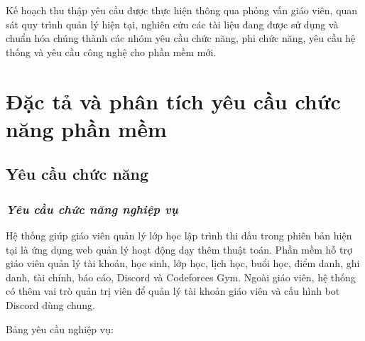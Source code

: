 \documentclass[12pt,a4paper]{article}
\begin{document}
Kế hoạch thu thập yêu cầu được thực hiện thông qua phỏng vấn giáo viên, quan sát
quy trình quản lý hiện tại, nghiên cứu các tài liệu đang được sử dụng và chuẩn
hóa chúng thành các nhóm yêu cầu chức năng, phi chức năng, yêu cầu hệ thống và
yêu cầu công nghệ cho phần mềm mới.

\section{Đặc tả và phân tích yêu cầu chức năng phần mềm}

\subsection{Yêu cầu chức năng}

\subsubsection{\textit{Yêu cầu chức năng nghiệp vụ}}

Hệ thống giúp giáo viên quản lý lớp học lập trình thi đấu trong phiên bản hiện tại là ứng dụng web
quản lý hoạt động dạy thêm thuật toán. Phần mềm hỗ trợ giáo viên quản lý tài
khoản, học sinh, lớp học, lịch học, buổi học, điểm danh, ghi danh, tài chính,
báo cáo, Discord và Codeforces Gym. Ngoài giáo viên, hệ thống có thêm vai trò
quản trị viên để quản lý tài khoản giáo viên và cấu hình bot Discord dùng chung.

Bảng yêu cầu nghiệp vụ:
\end{document}
